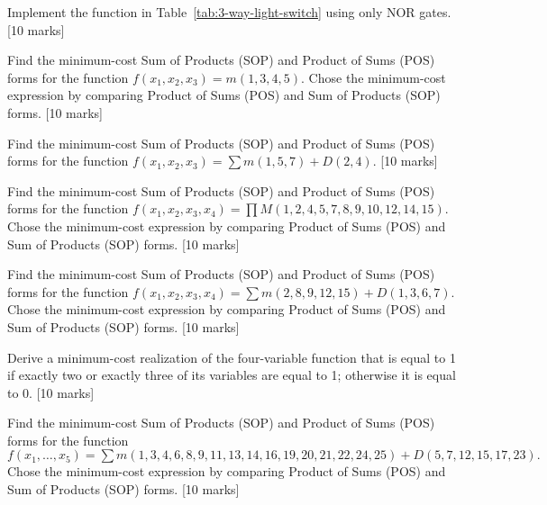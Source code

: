 \begin{prob}
 Implement the function in Table~\ref{tab:3-way-light-switch} using only NOR
 gates. [10 marks]
\end{prob}


\begin{prob}
Find the minimum-cost Sum of Products (SOP) and Product of Sums (POS) forms for the function $f(x_1 , x_2 , x_3 ) =
m(1, 3, 4, 5)$.  Chose the minimum-cost expression by comparing Product of Sums (POS) and Sum of Products (SOP) forms. [10 marks]
\label{prob:237}
\end{prob}

\begin{prob}
Find the minimum-cost Sum of Products (SOP) and Product of Sums (POS) forms for the function $f(x_1 , x_2 , x_3) =
\sum m(1, 5, 7) + D(2, 4)$.  [10 marks]
\end{prob}

\begin{prob}
Find the minimum-cost Sum of Products (SOP) and Product of Sums (POS) forms for the function $f(x_1 , x_2 , x_3,
x_4) = \prod M(1, 2, 4, 5, 7, 8, 9, 10, 12, 14, 15).$  Chose the minimum-cost
expression by comparing Product of Sums (POS) and Sum of Products (SOP) forms. [10 marks]
\end{prob}

\begin{prob}
Find the minimum-cost Sum of Products (SOP) and Product of Sums (POS) forms for the function $f(x_1 , x_2 , x_3, x_4) =
\sum m(2, 8, 9, 12, 15) + D(1, 3, 6, 7).$  Chose the minimum-cost expression
by comparing Product of Sums (POS) and Sum of Products (SOP) forms. [10 marks]
\end{prob}

\begin{prob}
Derive a minimum-cost realization of the four-variable function that is equal to 1 if exactly
two or exactly three of its variables are equal to 1; otherwise it is equal to
0.  [10 marks]
\end{prob}

\begin{prob}
  Find the minimum-cost Sum of Products (SOP) and Product of Sums (POS) forms for the function $f(x_1 , \dots, x_5) =
  \sum m(1, 3, 4, 6, 8, 9, 11, 13, 14, 16, 19, 20, 21, 22, 24, 25) + D(5, 7,
  12, 15, 17, 23).$  Chose the minimum-cost expression by comparing Product of Sums (POS) and Sum of Products (SOP) forms. [10 marks]
\end{prob}
